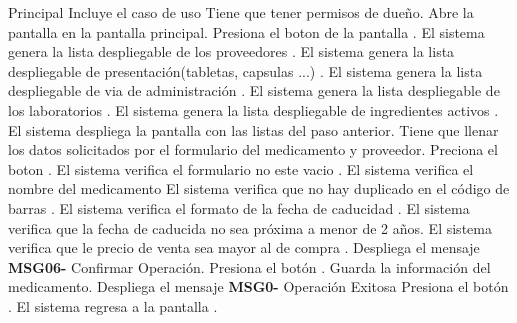  \begin{UCtrayectoria}{Principal}
 	\UCpaso Incluye el caso de uso 
 	\UCpaso [\UCactor] Tiene que tener permisos de dueño.
 	\UCpaso [\UCactor] Abre la pantalla  en la pantalla principal.
 	\UCpaso [\UCactor]Presiona el boton  de la pantalla .
 	\UCpaso El sistema genera la lista despliegable de los proveedores .
 	\UCpaso El sistema genera la lista despliegable de presentación(tabletas, capsulas ...) .
 	\UCpaso El sistema genera la lista despliegable de via de administración .%
 	\UCpaso El sistema genera la lista despliegable de los laboratorios .
 	\UCpaso El sistema genera la lista despliegable de ingredientes activos .%
 	\UCpaso El sistema despliega la pantalla  con las listas del paso anterior.
 	\UCpaso [\UCactor] Tiene que llenar los datos solicitados por el formulario del medicamento y proveedor.%
 	\UCpaso	[\UCactor]Preciona el boton .%
 	\UCpaso El sistema verifica el formulario no este vacio .
 	\UCpaso	El sistema verifica el nombre del medicamento 
 	\UCpaso	El sistema verifica que no hay duplicado en el código de barras .
 	\UCpaso El sistema verifica el formato de la  fecha de caducidad .
 	\UCpaso El sistema verifica que la fecha de caducida no sea próxima a menor de 2 años.%
 	\UCpaso El sistema verifica que le precio de venta sea mayor al de compra .
 	\UCpaso Despliega el mensaje {\bf MSG06-} {Confirmar Operación}. 
 	\UCpaso [\UCactor] Presiona el botón  .
 	\UCpaso Guarda la información del medicamento.
 	\UCpaso Despliega el mensaje {\bf MSG0-} {Operación Exitosa}
 	\UCpaso [\UCactor] Presiona el botón .
 	\UCpaso El sistema regresa a la pantalla  .
 	
 \end{UCtrayectoria}
 
